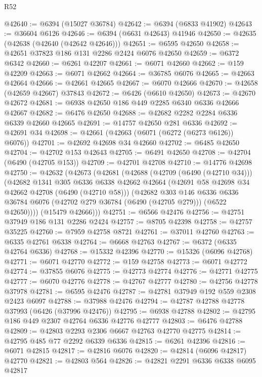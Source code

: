 \begin{lexlean}{R52}
\begin{coremodule}
@42640 := @6394 (@15027 @36784)
@42642 := @6394 (@6833 @41902)
@42643 := @36604 @6126
@42646 := @6394 (@6631 @42643) @41946
@42650 := @42635 (@42638 (@42640 (@42642 @42646)))
@42651 := @6595 @42650
@42658 := @42651 @37823 @186 @131 @2286 @2424 @6076 @42650
@42659 := @6372 @6342
@42660 := @6261 @42207
@42661 := @6071 @42660
@42662 := @159 @42209
@42663 := @6071 @42662
@42664 := @36785 @6076
@42665 := @42663 @42664
@42666 := @42661 @42665
@42667 := @6070 @42666
@42670 := @42658 (@42659 @42667) @37843
@42672 := @6426 (@6610 @42650)
@42673 := @42670 @42672
@42681 := @6938 @42650 @186 @449 @2285 @6340 @6336 @42666 @42667
@42682 := @6476 @42650
@42688 := @42682 @2282 @2284 @6336 @6339 @42660 @42665
@42691 := @14757 @42650 @281 @6336
@42692 := @42691 @34
@42698 := @42661 (@42663 (@6071 (@6272 (@6273 @6126)) @6076))
@42701 := @42692 @42698 @34 @42660
@42702 := @6485 @42650
@42704 := @42702 @153 @42643
@42705 := @6491 @42650
@42708 := @42704 (@6490 (@42705 @153))
@42709 := @42701 @42708
@42710 := @14776 @42698
@42750 := @42632
    (@42673
      (@42681
        (@42688
          (@42709 (@6490 (@42710 @34)))
          (@42682
            @1341
            @305
            @6336
            @6338
            @42662
            @42664
            (@42691 @58 @42698 @34 @42662 @42708 (@6490 (@42710 @58)))
            (@42682
              @303
              @146
              @6336
              @6336
              @36784
              @6076
              (@42702 @279 @36784 (@6490 (@42705 @279)))
              (@6522 @42650))))
        (@15479 @42666)))
@42751 := @6566 @42476
@42756 := @42751 @37949 @186 @131 @2286 @2424
@42757 := @8705 @42398
@42758 := @42757 @35225
@42760 := @7959 @42758 @8721
@42761 := @37011 @42760
@42763 := @6335 @42761 @6338
@42764 := @6668 @42763
@42767 := @6372 (@6335 @42764 @6336)
@42768 := @15332 @42396
@42770 := @15326 (@6096 @42768)
@42771 := @6071 @42770
@42772 := @159 @42758
@42773 := @6071 @42772
@42774 := @37855 @6076
@42775 := @42773 @42774
@42776 := @42771 @42775
@42777 := @6070 @42776
@42778 := @42767 @42777
@42780 := @42756 @42778 @37978
@42781 := @6595 @42476
@42787 := @42781 @37949 @192 @559 @2308 @2423 @6097
@42788 := @37988 @42476
@42794 := @42787 @42788 @42778 @37993 (@6426 (@37996 @42476))
@42795 := @6938 @42788
@42802 := @42795 @186 @449 @2307 @42764 @6336 @42776 @42777
@42803 := @6476 @42788
@42809 := @42803 @2293 @2306 @6667 @42763 @42770 @42775
@42814 := @42795 @485 @77 @2292 @6339 @6336
@42815 := @6261 @42396
@42816 := @6071 @42815
@42817 := @42816 @6076
@42820 := @42814 (@6096 @42817) @42770
@42821 := @42803 @564
@42826 := @42821 @2291 @6336 @6338 @6095 @42817

\end{coremodule}
\end{lexlean}
